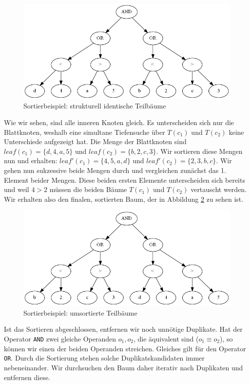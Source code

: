 \begin{figure}
\includegraphics[scale=0.55]{Bilder/sort_exfinb0.png}
\caption{Sortierbeispiel: strukturell identische Teilbäume}
\label{fig:sort_exfinb0}
\end{figure}

Wie wir sehen, sind alle inneren Knoten gleich. Es unterscheiden sich nur die Blattknoten, weshalb eine simultane Tiefensuche über $T(c_1)$ und $T(c_2)$ keine Unterschiede aufgezeigt hat. Die Menge der Blattknoten sind $\mathit{leaf}(c_1) = \{d,4,a,5\}$ und $\mathit{leaf}(c_2) = \{b,2,c,3\}$. Wir sortieren diese Mengen nun und erhalten: $\mathit{leaf'}(c_1) = \{4,5,a,d\}$ und $\mathit{leaf'}(c_2) = \{2,3,b,c\}$.
Wir gehen nun sukzessive beide Mengen durch und vergleichen zunächst das 1. Element beider Mengen. Diese beiden ersten Elemente unterscheiden sich bereits und weil $4 > 2$ müssen die beiden Bäume $T(c_1)$ und $T(c_2)$ vertauscht werden. Wir erhalten also den finalen, sortierten Baum, der in Abbildung \ref{fig:sort_exfinb1} zu sehen ist.

\begin{figure}
\includegraphics[scale=0.55]{Bilder/sort_exfinb1.png}
\caption{Sortierbeispiel: umsortierte Teilbäume}
\label{fig:sort_exfinb1}
\end{figure}

Ist das Sortieren abgeschlossen, entfernen wir noch unnötige Duplikate. Hat der Operator \verb|AND| zwei gleiche Operanden $o_1,o_2$, die äquivalent sind ($o_1 \equiv o_2$), so können wir einen der beiden Operanden streichen. Gleiches gilt für den Operator \verb|OR|. Durch die Sortierung stehen solche Duplikatskandidaten immer nebeneinander. Wir durchsuchen den Baum daher iterativ nach Duplikaten und entfernen diese.

